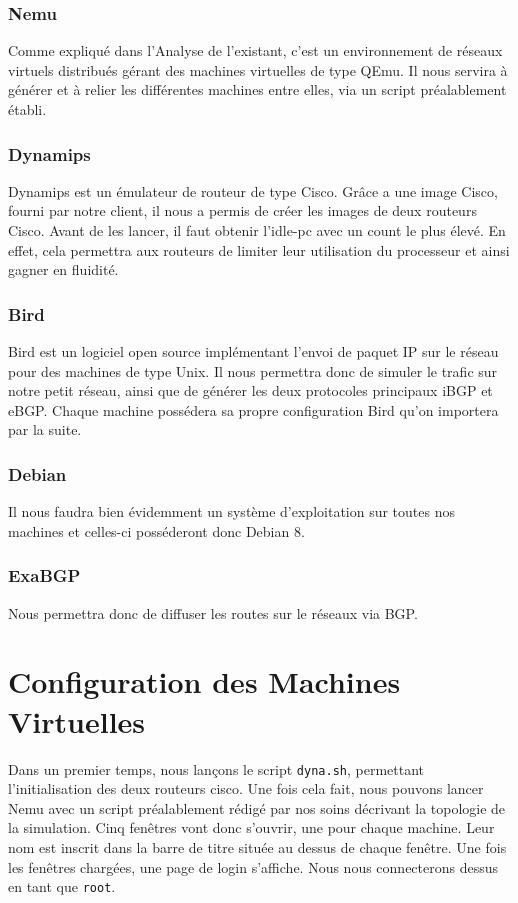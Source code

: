 \subsubsection{Nemu}
Comme expliqué dans l'Analyse de l'existant, c'est un environnement de réseaux virtuels distribués gérant des machines virtuelles de type QEmu. Il nous servira à générer et à relier les différentes machines entre elles, via un script préalablement établi.

\subsubsection{Dynamips}
Dynamips est un émulateur de routeur de type Cisco. Grâce a une image Cisco, fourni par notre client, il nous a permis de créer les images de deux routeurs Cisco. Avant de les lancer, il faut obtenir l'idle-pc avec un count le plus élevé. En effet, cela permettra aux routeurs de limiter leur utilisation du processeur et ainsi gagner en fluidité.

\subsubsection{Bird}
Bird est un logiciel open source implémentant l'envoi de paquet IP sur le réseau pour des machines de type Unix. Il nous permettra donc de simuler le trafic sur notre petit réseau, ainsi que de générer les deux protocoles principaux iBGP et eBGP. Chaque machine possédera sa propre configuration Bird qu'on importera par la suite.

\subsubsection{Debian}
Il nous faudra bien évidemment un système d'exploitation sur toutes nos machines et celles-ci posséderont donc Debian 8.

\subsubsection{ExaBGP}
Nous permettra donc de diffuser les routes sur le réseaux via BGP.

\section{Configuration des Machines Virtuelles}

Dans un premier temps, nous lançons le script \verb+dyna.sh+, permettant l'initialisation des deux routeurs cisco.
Une fois cela fait, nous pouvons lancer Nemu avec un script préalablement rédigé par nos soins décrivant la topologie de la simulation.
Cinq fenêtres vont donc s'ouvrir, une pour chaque machine. Leur nom est inscrit dans la barre de titre située au dessus de chaque fenêtre.
Une fois les fenêtres chargées, une page de login s'affiche. Nous nous connecterons dessus en tant que \verb+root+.

